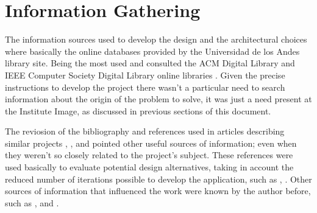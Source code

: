 \section{Information Gathering}
The information sources used to develop the design and the architectural choices where basically the online databases provided by the Universidad de los Andes library site. Being the most used and consulted the ACM Digital Library and IEEE Computer Society Digital Library online libraries . Given the precise instructions to develop the project there wasn't a particular need to search information about the origin of the problem to solve, it was just a need present at the Institute Image, as discussed in previous sections of this document.

The reviosion of the bibliography and references used in articles describing similar projects \cite{Kadobayashi}, \cite{Sonnet}, \cite{Duval} and \cite{Jung}  pointed other useful sources of information; even when they weren't so closely related to the project's subject. These references were used basically to evaluate potential design alternatives, taking in account the reduced number of iterations possible to develop the application, such as \cite{Bernheim}, \cite{Hong}. Other sources of information that influenced the work were known by the author before, such as \cite{apple}, \cite{37signals} and \cite{lidwell2003universal}.